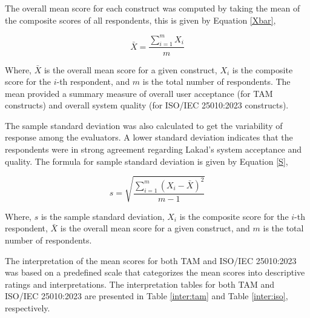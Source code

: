 The overall mean score for each construct was computed by taking the mean of the composite scores of all respondents, this is given by Equation \ref{Xbar},

\begin{equation}
	\label{Xbar}
	\bar{X} = \frac{\sum_{i=1}^{m} X_i}{m}
\end{equation}

Where, $\bar{X}$ is the overall mean score for a given construct, $X_i$ is the composite score for the $i$-th respondent, and $m$ is the total number of respondents. The mean provided a summary measure of overall user acceptance (for TAM constructs) and overall system quality (for ISO/IEC 25010:2023 constructs). 

The sample standard deviation was also calculated to get the variability of response among the evaluators. A lower standard deviation indicates that the respondents were in strong agreement regarding Lakad’s system acceptance and quality.  The formula for sample standard deviation is given by Equation \ref{S},

\begin{equation}
	\label{S}
	s = \sqrt{\frac{\sum_{i=1}^{m} (X_i - \bar{X})^2}{m-1}}
\end{equation}

Where, $s$ is the sample standard deviation, $X_i$ is the composite score for the $i$-th respondent, $\bar{X}$ is the overall mean score for a given construct, and $m$ is the total number of respondents.

The interpretation of the mean scores for both TAM and ISO/IEC 25010:2023 was based on a predefined scale that categorizes the mean scores into descriptive ratings and interpretations. The interpretation tables for both TAM and ISO/IEC 25010:2023 are presented in Table \ref{inter:tam} and Table \ref{inter:iso}, respectively.

